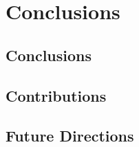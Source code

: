 
\chapter{Conclusions}
\label{sec:conclusoins}

\section{Conclusions}
\section{Contributions}
\section{Future Directions}


